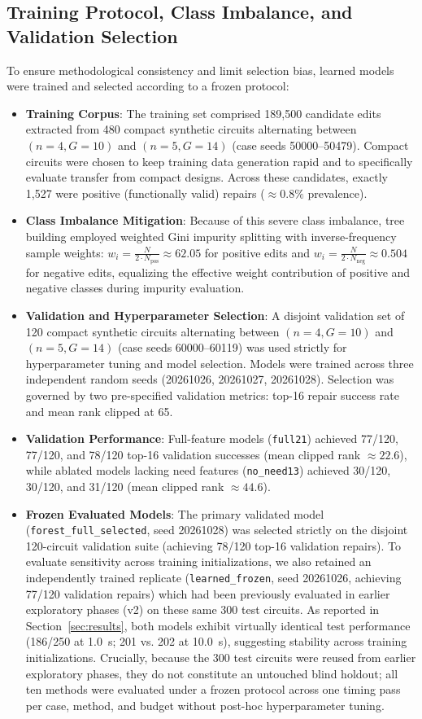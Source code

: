 \documentclass[11pt,a4paper]{article}
\begin{document}
\subsection{Training Protocol, Class Imbalance, and Validation Selection}
To ensure methodological consistency and limit selection bias, learned models were trained and selected according to a frozen protocol:
\begin{itemize}
    \item \textbf{Training Corpus}: The training set comprised 189,500 candidate edits extracted from 480 compact synthetic circuits alternating between $(n=4, G=10)$ and $(n=5, G=14)$ (case seeds 50000--50479). Compact circuits were chosen to keep training data generation rapid and to specifically evaluate transfer from compact designs. Across these candidates, exactly 1,527 were positive (functionally valid) repairs ($\approx 0.8\%$ prevalence).
    \item \textbf{Class Imbalance Mitigation}: Because of this severe class imbalance, tree building employed weighted Gini impurity splitting with inverse-frequency sample weights: $w_i = \frac{N}{2 \cdot N_{\text{pos}}} \approx 62.05$ for positive edits and $w_i = \frac{N}{2 \cdot N_{\text{neg}}} \approx 0.504$ for negative edits, equalizing the effective weight contribution of positive and negative classes during impurity evaluation.
    \item \textbf{Validation and Hyperparameter Selection}: A disjoint validation set of 120 compact synthetic circuits alternating between $(n=4, G=10)$ and $(n=5, G=14)$ (case seeds 60000--60119) was used strictly for hyperparameter tuning and model selection. Models were trained across three independent random seeds (20261026, 20261027, 20261028). Selection was governed by two pre-specified validation metrics: top-16 repair success rate and mean rank clipped at 65.
    \item \textbf{Validation Performance}: Full-feature models (\texttt{full21}) achieved 77/120, 77/120, and 78/120 top-16 validation successes (mean clipped rank $\approx 22.6$), while ablated models lacking need features (\texttt{no\_need13}) achieved 30/120, 30/120, and 31/120 (mean clipped rank $\approx 44.6$).
    \item \textbf{Frozen Evaluated Models}: The primary validated model (\texttt{forest\_full\_selected}, seed 20261028) was selected strictly on the disjoint 120-circuit validation suite (achieving 78/120 top-16 validation repairs). To evaluate sensitivity across training initializations, we also retained an independently trained replicate (\texttt{learned\_frozen}, seed 20261026, achieving 77/120 validation repairs) which had been previously evaluated in earlier exploratory phases (v2) on these same 300 test circuits. As reported in Section~\ref{sec:results}, both models exhibit virtually identical test performance (186/250 at 1.0~s; 201 vs. 202 at 10.0~s), suggesting stability across training initializations. Crucially, because the 300 test circuits were reused from earlier exploratory phases, they do not constitute an untouched blind holdout; all ten methods were evaluated under a frozen protocol across one timing pass per case, method, and budget without post-hoc hyperparameter tuning.

\end{itemize}
\end{document}
